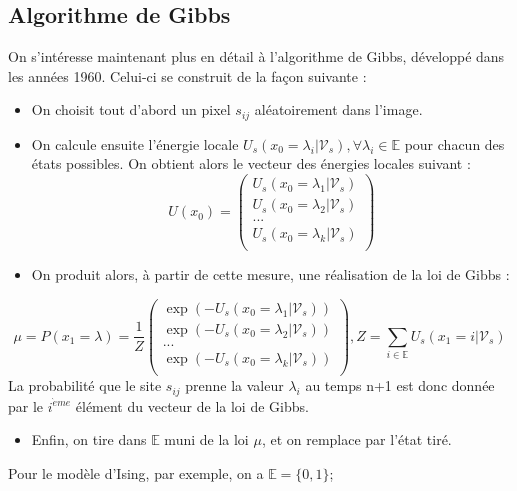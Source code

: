 \documentclass[a4paper, 12pt]{article}
\begin{document}
\subsection[Algorithme de Gibbs]{Algorithme de Gibbs}
On s'intéresse maintenant plus en détail à l'algorithme de Gibbs, développé dans les années 1960. Celui-ci se construit de la façon suivante : 
\begin{itemize}
\item On choisit tout d'abord un pixel $s_{ij} $ aléatoirement dans l'image.
\item On calcule ensuite l'énergie locale $U_s(x_0=\lambda_i| \mathcal{V}_s), \forall \lambda_i \in \mathbb{E}$ pour chacun des états possibles. On obtient alors le vecteur des énergies locales suivant : 
\[
  U(x_0) = \left(
          \begin{array}{ll}
            U_s(x_0=\lambda_1| \mathcal{V}_s) \\
            U_s(x_0=\lambda_2| \mathcal{V}_s) \\
            ...\\
            U_s(x_0=\lambda_k| \mathcal{V}_s) \\
          \end{array}
        \right)
\]
\item On produit alors, à partir de cette mesure, une réalisation de la loi de Gibbs : 
\end{itemize}
\[
  \mu = P(x_1 = \lambda) = \frac{1}{Z} \left(
          \begin{array}{ll}
            \exp(-U_s(x_0=\lambda_1| \mathcal{V}_s)) \\
            \exp(-U_s(x_0=\lambda_2| \mathcal{V}_s)) \\
            ...\\
            \exp(-U_s(x_0=\lambda_k| \mathcal{V}_s)) \\
          \end{array}
        \right)
        , Z= \sum_{i\in \mathbb{E}} {U_s(x_1=i | \mathcal{V}_s)}
\]
La probabilité que le site $s_{ij}$ prenne la valeur $\lambda_i$ au temps n+1 est donc donnée par le $i^{\grave{e}me}$ élément du vecteur de la loi de Gibbs.
\begin{itemize}
\item Enfin, on tire dans $\mathbb{E}$ muni de la loi $\mu$, et on remplace par l'état tiré.
\end{itemize}
Pour le modèle d'Ising, par exemple, on a $\mathbb{E} =\{0,1\}$;
\end{document}
